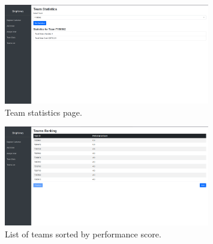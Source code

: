 \begin{figure}[H]
    \centering
    \includegraphics[width=0.8\textwidth]{img/web_app/stats.png}
    \caption{Team statistics page.}
\end{figure}

\begin{figure}[H]
    \centering
    \includegraphics[width=0.8\textwidth]{img/web_app/list.png}
    \caption{List of teams sorted by performance score.}
\end{figure}